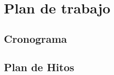 \section{Plan de trabajo}
  \subsection{Cronograma}
    
  \subsection{Plan de Hitos}
    
\clearpage
